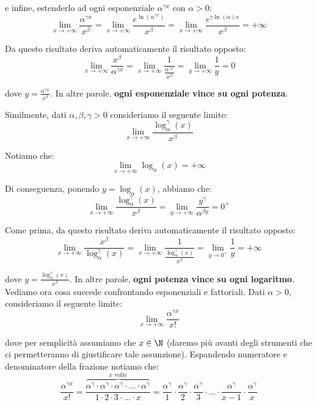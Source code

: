 \documentclass[a4paper, 12pt]{report}
\begin{document}
    e infine, estenderlo ad ogni esponenziale $\alpha^{\gamma x}$ con $\alpha > 0$:
    \[\lim_{x \to +\infty} \frac{\alpha^{\gamma x}}{x^{\beta}} = \lim_{x \to +\infty} \frac{e^{\ln(\alpha^{\gamma x})}}{x^{\beta}} = \lim_{x \to +\infty} \frac{e^{\gamma \ln(\alpha) x }}{x^{\beta}} = +\infty\]

    Da questo risultato deriva automaticamente il risultato opposto:
    \[\lim_{x \to +\infty} \frac{x^{\beta}}{\alpha^{\gamma x}} = \lim_{x \to +\infty} \frac{1}{\frac{\alpha^{\gamma x}}{x^{\beta}}} = \lim_{y \to +\infty} \frac{1}{y} = 0\]

    dove $y = \frac{\alpha^{\gamma x}}{x^{\beta}}$. In altre parole, \textbf{ogni esponenziale vince su ogni potenza}.

    Similmente, dati $\alpha, \beta, \gamma > 0$ consideriamo il seguente limite:
    \[\lim_{x \to +\infty} \frac{\log_{\alpha}^\gamma (x)}{x^{\beta}}\]
    
    Notiamo che:
    \[\lim_{x \to +\infty} \log_\alpha(x) = +\infty\]

    Di conseguenza, ponendo $y = \log_\alpha(x)$, abbiamo che:
    \[\lim_{x \to +\infty} \frac{\log_{\alpha}^\gamma (x)}{x^{\beta}} = \lim_{y \to +\infty} \frac{y^\gamma}{\alpha^{\beta y}} = 0^+\]

    Come prima, da questo risultato deriva automaticamente il risultato opposto:
    \[\lim_{x \to +\infty} \frac{x^{\beta}}{\log_{\alpha}^\gamma (x)} = \lim_{x \to +\infty} \frac{1}{\frac{\log_{\alpha}^\gamma (x)}{x^{\beta}}} = \lim_{y \to 0^+} \frac{1}{y} = +\infty\]
    
    dove $y = \frac{\log_{\alpha}^\gamma (x)}{x^{\beta}}$. In altre parole, \textbf{ogni potenza vince su ogni logaritmo}. Vediamo ora cosa succede confrontando esponenziali e fattoriali. Dati $\alpha > 0$, consideriamo il seguente limite:
    \[\lim_{x \to +\infty} \frac{\alpha^{\gamma x}}{x!} \]

    dove per semplicità assumiamo che $x \in \N$ (daremo più avanti degli strumenti che ci permetteranno di giustificare tale assunzione). Espandendo numeratore e denominatore della frazione notiamo che:
    \[ \frac{\alpha^{\gamma x}}{x!} =  \frac{\overbrace{\alpha^{\gamma} \cdot \alpha^{\gamma} \cdot \alpha^{\gamma} \cdot \ldots \cdot \alpha^\gamma}^{\text{$x$ volte}}}{1 \cdot 2 \cdot 3 \cdot \ldots \cdot x} =  \frac{\alpha^\gamma}{1} \cdot \frac{\alpha^\gamma}{2} \cdot \frac{\alpha^\gamma}{3} \cdot \ldots \cdot \frac{\alpha^\gamma}{x-1} \cdot \frac{\alpha^\gamma}{x} \]
\end{document}
